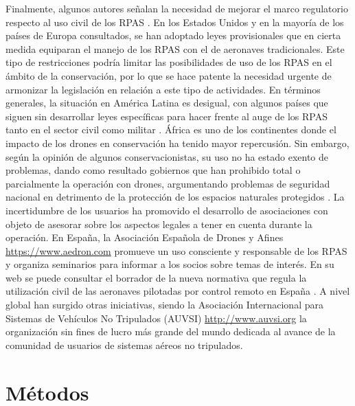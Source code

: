 \documentclass[onecolumn]{extarticle}
\begin{document}
Finalmente, algunos autores señalan la necesidad de mejorar el marco
regulatorio respecto al uso civil de los RPAS \citep{Nugraha2016}. En
los Estados Unidos y en la mayoría de los países de Europa consultados,
se han adoptado leyes provisionales que en cierta medida equiparan el
manejo de los RPAS con el de aeronaves tradicionales. Este tipo de
restricciones podría limitar las posibilidades de uso de los RPAS en el
ámbito de la conservación, por lo que se hace patente la necesidad
urgente de armonizar la legislación en relación a este tipo de
actividades. En términos generales, la situación en América Latina es
desigual, con algunos países que siguen sin desarrollar leyes
específicas para hacer frente al auge de los RPAS tanto en el sector
civil como militar \citep{Nacion2013}. África es uno de los continentes
donde el impacto de los drones en conservación ha tenido mayor
repercusión. Sin embargo, según la opinión de algunos conservacionistas,
su uso no ha estado exento de problemas, dando como resultado gobiernos
que han prohibido total o parcialmente la operación con drones,
argumentando problemas de seguridad nacional en detrimento de la
protección de los espacios naturales protegidos \citep{Andrews2014}. La
incertidumbre de los usuarios ha promovido el desarrollo de asociaciones
con objeto de asesorar sobre los aspectos legales a tener en cuenta
durante la operación. En España, la Asociación Española de Drones y
Afines \url{https://www.aedron.com} promueve un uso consciente y
responsable de los RPAS y organiza seminarios para informar a los socios
sobre temas de interés. En su web se puede consultar el borrador de la
nueva normativa que regula la utilización civil de las aeronaves
pilotadas por control remoto en España \citep{Aedron2017}. A nivel
global han surgido otras iniciativas, siendo la Asociación Internacional
para Sistemas de Vehículos No Tripulados (AUVSI)
\url{http://www.auvsi.org} la organización sin fines de lucro más grande
del mundo dedicada al avance de la comunidad de usuarios de sistemas
aéreos no tripulados.

\section{Métodos}\label{metodos}
\end{document}
